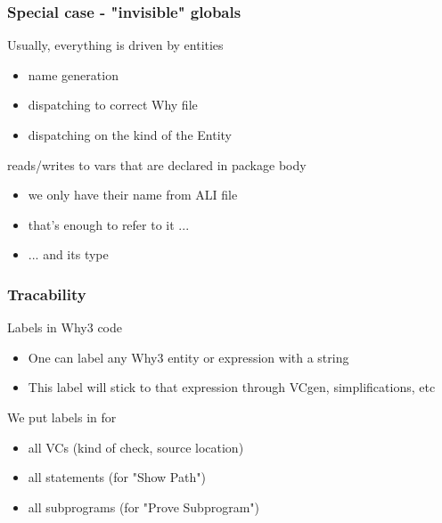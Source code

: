 \documentclass{beamer}
\newenvironment{specialframe}{%
  \begin{frame}[fragile,environment=specialframe]}{\end{frame}}
\begin{document}
\begin{specialframe}\frametitle{Special case - "invisible" globals}
   \begin{block}{Usually, everything is driven by entities}
      \begin{itemize}
         \item name generation
         \item dispatching to correct Why file
         \item dispatching on the kind of the Entity
      \end{itemize}
   \end{block}
   \begin{block}{reads/writes to vars that are declared in package body}
      \begin{itemize}
         \item we only have their name from ALI file
         \item that's enough to refer to it ...
         \item ... and its type
      \end{itemize}
   \end{block}
\end{specialframe}

\begin{specialframe}\frametitle{Tracability}
   \begin{block}{Labels in Why3 code}
      \begin{itemize}
         \item One can label any Why3 entity or expression with a string
         \item This label will stick to that expression through VCgen,
         simplifications, etc
      \end{itemize}
   \end{block}
   \begin{block}{We put labels in for}
      \begin{itemize}
         \item all VCs (kind of check, source location)
         \item all statements (for "Show Path")
         \item all subprograms (for "Prove Subprogram")
      \end{itemize}
   \end{block}
\end{specialframe}
\end{document}
